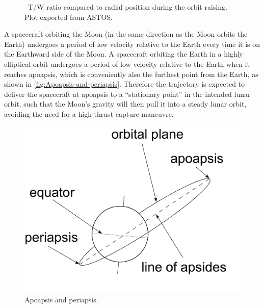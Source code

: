 \begin{figure}
\begin{center}
\end{center}
\caption{\BW\ T/W ratio compared to radial position during the orbit raising. Plot exported from ASTOS.}
\label{fig:BW1-T/W-ratio}
\end{figure}

A spacecraft orbiting the Moon (in the same direction as the Moon orbits the Earth) undergoes a period of low velocity relative to the Earth every time it is on the Earthward side of the Moon. A spacecraft orbiting the Earth in a highly elliptical orbit undergoes a period of low velocity relative to the Earth when it reaches apoapsis, which is conveniently also the furthest point from the Earth, as shown in \autoref{fig:Apoapsis-and-periapsis}. Therefore the trajectory is expected to deliver the spacecraft at apoapsis to a \enquote{stationary point} in the intended lunar orbit, such that the Moon's gravity will then pull it into a steady lunar orbit, avoiding the need for a high-thrust capture maneuvre.

\begin{figure}
\begin{center}
\includegraphics[scale=0.4]{Images/apsides.pdf}
\end{center}
\caption{Apoapsis and periapsis.}
\label{fig:Apoapsis-and-periapsis}
\end{figure}

